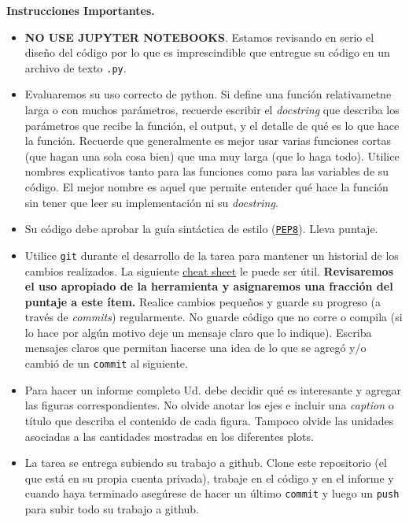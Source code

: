 \documentclass[letter, 11pt]{article}
\begin{document}
\vspace{2em}
\noindent\textbf{Instrucciones Importantes.}
\begin{itemize}

\item \textbf{NO USE JUPYTER NOTEBOOKS}. Estamos revisando en serio el diseño
  del código por lo que es imprescindible que entregue su código en un archivo
  de texto \texttt{.py}.

\item Evaluaremos su uso correcto de python. Si define una función
  relativametne larga o con muchos parámetros, recuerde escribir el
  \emph{docstring} que describa los parámetros que recibe la función, el
  output, y el detalle de qué es lo que hace la función. Recuerde que
  generalmente es mejor usar varias funciones cortas (que hagan una sola cosa
  bien) que una muy larga (que lo haga todo).  Utilice nombres explicativos
  tanto para las funciones como para las variables de su código. El mejor
  nombre es aquel que permite entender qué hace la función sin tener que leer
  su implementación ni su \emph{docstring}.

\item Su código debe aprobar la guía sintáctica de estilo
  (\href{https://www.python.org/dev/peps/pep-0008/}{\texttt{PEP8}}). Lleva
  puntaje.

\item Utilice \texttt{git} durante el desarrollo de la tarea para mantener un
  historial de los cambios realizados. La siguiente
  \href{https://education.github.com/git-cheat-sheet-education.pdf}{cheat
    sheet} le puede ser útil. {\bf Revisaremos el uso apropiado de la
  herramienta y asignaremos una fracción del puntaje a este ítem.} Realice
  cambios pequeños y guarde su progreso (a través de \emph{commits})
  regularmente. No guarde código que no corre o compila (si lo hace por algún
  motivo deje un mensaje claro que lo indique). Escriba mensajes claros que
  permitan hacerse una idea de lo que se agregó y/o cambió de un
  \texttt{commit} al siguiente.

\item Para hacer un informe completo Ud. debe decidir qué es interesante y
  agregar las figuras correspondientes. No olvide anotar los ejes e incluir una
  \emph{caption} o título que describa el contenido de cada figura. Tampoco
  olvide las unidades asociadas a las cantidades mostradas en los diferentes
  plots.

\item La tarea se entrega subiendo su trabajo a github. Clone este repositorio
  (el que está en su propia cuenta privada), trabaje en el código y en el
  informe y cuando haya terminado asegúrese de hacer un último \texttt{commit}
  y luego un \texttt{push} para subir todo su trabajo a github.


\end{itemize}
\end{document}
